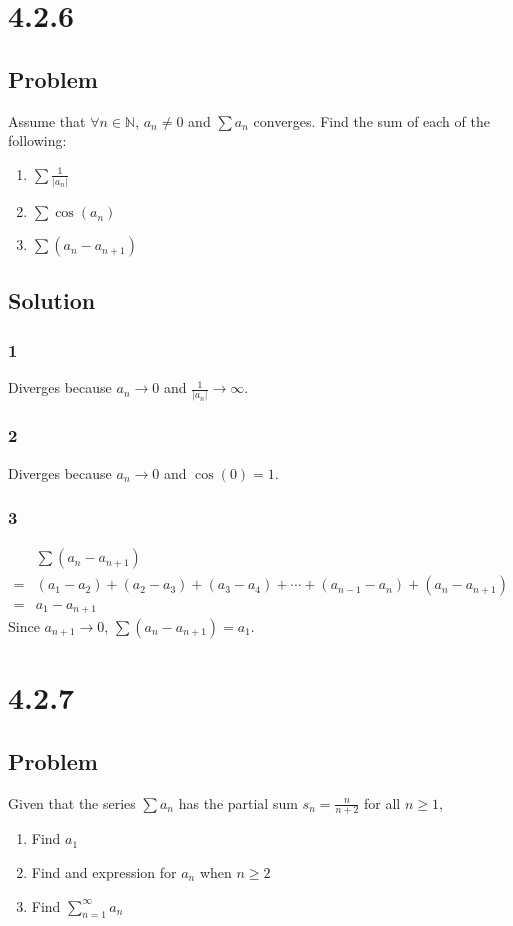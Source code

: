 \documentclass[12pt]{article}
\newcommand{\abs}  [1]{\left|       #1 \right|      }
\newcommand{\N}    [0]{\mathbb{N}                   }
\begin{document}
\section*{4.2.6}

\subsection*{Problem}
Assume that $\forall n \in \N$, $a_n \neq 0$ and $\sum a_n$ converges. Find the sum of each of the following:
\begin{enumerate}
    \item $\sum \frac{1}{\abs{a_n}}$
    \item $\sum \cos(a_n)$
    \item $\sum (a_n - a_{n+1})$
\end{enumerate}

\subsection*{Solution}

\subsubsection*{1}
Diverges because $a_n \to 0$ and $\frac{1}{\abs{a_n}} \to \infty$.

\subsubsection*{2}
Diverges because $a_n \to 0$ and $\cos(0) = 1$.

\subsubsection*{3}
\begin{align*}
     & \sum (a_n - a_{n+1}) \\
    =& (a_1 - a_2) + (a_2 - a_3) + (a_3 - a_4) + \cdots + (a_{n-1} - a_n) + (a_n - a_{n+1}) \\
    =& a_1 - a_{n+1}
\end{align*}
Since $a_{n+1} \to 0$, $\sum (a_n - a_{n+1}) = a_1$.



\section*{4.2.7}

\subsection*{Problem}
Given that the series $\sum a_n$ has the partial sum $s_n = \frac{n}{n+2}$ for all $n \geq 1$,
\begin{enumerate}
    \item Find $a_1$
    \item Find and expression for $a_n$ when $n \geq 2$
    \item Find $\sum_{n=1}^\infty a_n$
\end{enumerate}
\end{document}
